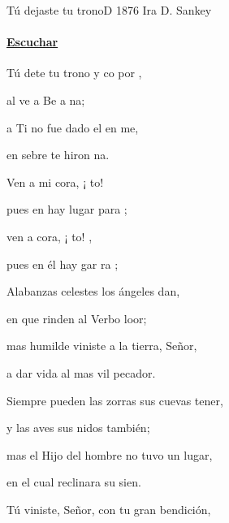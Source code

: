\documentclass[12pt, spanish]{book}
\newcommand{\NotCCLIed}{\relax}
\begin{document}
    \begin{song}{Tú dejaste tu trono}{D}
    {1876} %
    {Ira D. Sankey}
    {} %
    {} %
        \ifChordBk
            \paragraph{\mbox{}\hfill\protect\href{https://open.spotify.com/intl-es/track/5nKWzIVS1fPfV1StbUYxFt}{Escuchar}\mbox{}\hfill}
        \fi

        \begin{SBOpGroup}
            Tú dete tu trono y co por ,

            al ve a Be a na;

             a Ti no fue dado el en  me,

             en sebre te hiron na.
        \end{SBOpGroup}

        \begin{SBChorus}
            Ven a mi cora, ¡ to!

            pues en  hay lugar para ;

            ven a  cora, ¡ to! ,

            pues en él hay gar ra ;
        \end{SBChorus}

        \begin{SBOpGroup}
            Alabanzas celestes los ángeles dan,

            en que rinden al Verbo loor;

            mas humilde viniste a la tierra, Señor,

            a dar vida al mas vil pecador.
        \end{SBOpGroup}
        \vskip 20pt
        \begin{SBOpGroup}
            Siempre pueden las zorras sus cuevas tener,

            y las aves sus nidos también;

            mas el Hijo del hombre no tuvo un lugar,

            en el cual reclinara su sien.
        \end{SBOpGroup}
        \vskip 20pt
        \begin{SBOpGroup}
            Tú viniste, Señor, con tu gran bendición,


\end{SBOpGroup}
\end{song}
\end{document}
